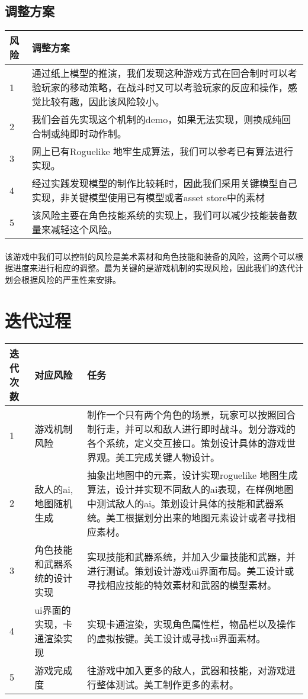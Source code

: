 \documentclass{article}
\begin{document}
\subsection{调整方案}
\begin{table}[htbp]
	\centering
	\begin{tabular}{|p{1.0cm}|p{11.0cm}|}
		\hline
		风险 & 调整方案 \\
		\hline
		1 & 通过纸上模型的推演，我们发现这种游戏方式在回合制时可以考验玩家的移动策略，在战斗时又可以考验玩家的反应和操作，感觉比较有趣，因此该风险较小。 \\
		\hline
		2 & 我们会首先实现这个机制的demo，如果无法实现，则换成纯回合制或纯即时动作制。 \\
		\hline
		3 & 网上已有Roguelike 地牢生成算法，我们可以参考已有算法进行实现。 \\
		\hline
		4 & 经过实践发现模型的制作比较耗时，因此我们采用关键模型自己实现，非关键模型使用已有模型或者asset store中的素材 \\
		\hline
		5 & 该风险主要在角色技能系统的实现上，我们可以减少技能装备数量来减轻这个风险。 \\
		\hline
	\end{tabular}
\end{table}
\paragraph{}
该游戏中我们可以控制的风险是美术素材和角色技能和装备的风险，这两个可以根据进度来进行相应的调整。最为关键的是游戏机制的实现风险，因此我们的迭代计划会根据风险的严重性来安排。
\section{迭代过程}
\begin{table}[htbp]
	\centering
	\begin{tabular}{|p{1cm}|p{3cm}|p{8cm}|}
		\hline
		迭代次数 & 对应风险 & 任务 \\
		\hline
		1 & 游戏机制风险 & 制作一个只有两个角色的场景，玩家可以按照回合制行走，并可以和敌人进行即时战斗。划分游戏的各个系统，定义交互接口。策划设计具体的游戏世界观。美工完成关键人物设计。 \\
		\hline
		2 & 敌人的ai,地图随机生成 & 抽象出地图中的元素，设计实现roguelike 地图生成算法，设计并实现不同敌人的ai表现，在样例地图中测试敌人的ai。策划设计具体的技能和武器系统。美工根据划分出来的地图元素设计或者寻找相应素材。 \\
		\hline
		3 & 角色技能和武器系统的设计实现 & 实现技能和武器系统，并加入少量技能和武器，并进行测试。策划设计游戏ui界面布局。美工设计或寻找相应技能的特效素材和武器的模型素材。 \\
		\hline
		4 & ui界面的实现，卡通渲染实现 & 实现卡通渲染，实现角色属性栏，物品栏以及操作的虚拟按键。美工设计或寻找ui界面素材。 \\
		\hline
		5 & 游戏完成度 & 往游戏中加入更多的敌人，武器和技能，对游戏进行整体测试。美工制作更多的素材。 \\
		\hline
	\end{tabular}
\end{table}
\newpage
\end{document}
